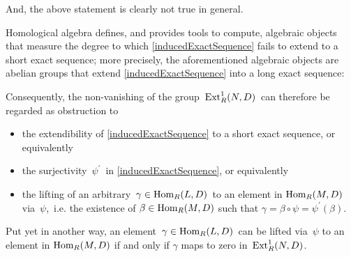 \begin{remark}
\begin{itemize}
\begin{center}
	\end{center}
	And, the above statement is clearly not true in general.
\end{itemize}
Homological algebra defines, and provides tools to compute, algebraic objects
that measure the degree to which
\eqref{inducedExactSequence}
{\color{red}fails to extend to a short exact sequence};
more precisely, the aforementioned algebraic objects are abelian groups
that extend \eqref{inducedExactSequence} into a long exact sequence:
\begin{center}
\end{center}
Consequently, the non-vanishing of the group
\,$\textnormal{Ext}^{1}_{R}(N,D)$\,
can therefore be regarded as {\color{red}obstruction} to
\begin{itemize}
\item
	the extendibility of \eqref{inducedExactSequence} to a short exact sequence, or equivalently
\item
	the surjectivity \,$\psi^{\prime}$\, in \eqref{inducedExactSequence}, or equivalently
\item
	the lifting of an arbitrary \,$\gamma \in \textnormal{Hom}_{R}(L,D)$\, to an element in $\textnormal{Hom}_{R}(M,D)$ via \,$\psi$,\,
	i.e. the existence of $\beta \in \textnormal{Hom}_{R}(M,D)$ such that $\gamma = \beta \circ \psi = \psi^{\prime}(\beta)$.
\end{itemize}
Put yet in another way, an element \,$\gamma \in \textnormal{Hom}_{R}(L,D)$\, can be lifted via \,$\psi$
to an element in $\textnormal{Hom}_{R}(M,D)$ if and only if $\gamma$ maps to zero in
\,$\textnormal{Ext}^{1}_{R}(N,D)$.\,
\end{remark}

